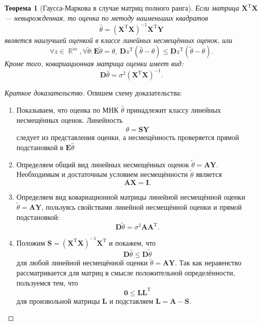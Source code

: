 \documentclass[specialist, subf, href, 12pt]{article}
\DeclareMathOperator\R{\mathbb{R}}
\newtheorem{theorem}{Теорема}
\begin{document}
	\begin{theorem}[Гаусса-Маркова в случае матриц полного ранга]
		Если матрица $\bm{X}^\mathrm{T}\bm{X}$ --- невырожденная, то оценка по методу наименьших квадратов
		\begin{equation}
			\widehat{\theta}=(\bm{X}^\mathrm{T}\bm{X})^{-1}\bm{X}^\mathrm{T}\bm{Y}\label{eq: est}
		\end{equation}
		является наилучшей оценкой в классе линейных несмещённых оценок, или
		\begin{equation*}
			\forall z\in\R^m,\forall\widetilde{\theta}:\mathbf{E}\widetilde{\theta}=\theta,~\mathbf{D}z^\mathrm{T}(\widehat{\theta}-\theta)\leqslant\mathbf{D}z^\mathrm{T}(\widetilde{\theta}-\theta).
		\end{equation*}  
		Кроме того, ковариационная матрица оценки имеет вид:
		\begin{equation*}
			\mathbf{D}\widehat{\theta}=\sigma^2(\bm{X}^\mathrm{T}\bm{X})^{-1}.
		\end{equation*}
	\end{theorem}
	\begin{proof}[Краткое доказательство]
		Опишем схему доказательства:
		\begin{enumerate}
			\item Показываем, что оценка по МНК $\widehat{\theta}$ принадлежит классу линейных несмещённых оценок. Линейность
			\begin{equation*}
				\widehat{\theta}=\bm{S}\bm{Y}
			\end{equation*} 
			следует из представления оценки, а несмещённость проверяется прямой подстановкой в $\mathbf{E}\widehat{\theta}$ 
			\item Определяем общий вид линейных несмещённых оценок $\widetilde{\theta}=\bm{AY}$. Необходимым и достаточным условием несмещённости $\widetilde{\theta}$ является 
			\begin{equation*}
				\bm{AX}=\bm{I}.
			\end{equation*}
			\item Определяем вид ковариационной матрицы линейной несмещённой оценки $\widetilde{\theta}=\bm{AY}$, пользуясь свойствами линейной несмещённой оценки и прямой подстановкой:
			\begin{equation*}
				\mathbf{D}\widetilde{\theta}=\sigma^2\bm{AA}^\mathrm{T}.
			\end{equation*}
			\item Положим $\bm{S}=(\bm{X}^\mathrm{T}\bm{X})^{-1}\bm{X}^\mathrm{T}$ и покажем, что \begin{equation*}
				\mathbf{D}\widehat{\theta}\leqslant\mathbf{D}\widetilde{\theta}
			\end{equation*}
			для любой линейной несмещённой оценки $\widetilde{\theta}=\bm{AY}$. Так как неравенство рассматривается для матриц в смысле положительной определённости, пользуемся тем, что 
			\begin{equation*}
				\bm{0}\leqslant\bm{LL}^\mathrm{T}
			\end{equation*}
			для произвольной матрицы $\bm{L}$ и подставляем $\bm{L}=\bm{A}-\bm{S}$.
		\end{enumerate}
	\end{proof}
\end{document}
